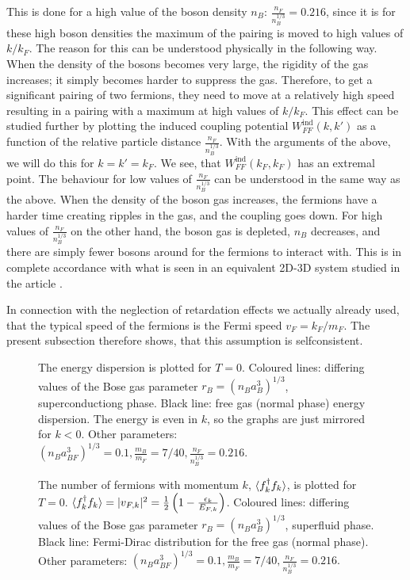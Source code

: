 This is done for a high value of the boson density $n_B$: $\frac{n_F}{n_B^{1/3}} = 0.216$, since it is for these high boson densities the maximum of the pairing is moved to high values of $k/k_F$. The reason for this can be understood physically in the following way. When the density of the bosons becomes very large, the rigidity of the gas increases; it simply becomes harder to suppress the gas. Therefore, to get a significant pairing of two fermions, they need to move at a relatively high speed resulting in a pairing with a maximum at high values of $k/k_F$. This effect can be studied further by plotting the induced coupling potential $W_{FF}^{\text{ind}}(k,k')$ as a function of the relative particle distance $\frac{n_F}{n_B^{1/3}}$. With the arguments of the above, we will do this for $k = k' = k_F$. We see, that $W_{FF}^{\text{ind}}(k_F,k_F)$ has an extremal point. The behaviour for low values of $\frac{n_F}{n_B^{1/3}}$ can be understood in the same way as the above. When the density of the boson gas increases, the fermions have a harder time creating ripples in the gas, and the coupling goes down. For high values of $\frac{n_F}{n_B^{1/3}}$ on the other hand, the boson gas is depleted, $n_B$ decreases, and there are simply fewer bosons around for the fermions to interact with. This is in complete accordance with what is seen in an equivalent 2D-3D system studied in the article \cite{BruunZhigangTopSuperfluid}. 

In connection with the neglection of retardation effects we actually already used, that the typical speed of the fermions is the Fermi speed $v_F = k_F/m_F$. The present subsection therefore shows, that this assumption is selfconsistent. 


\begin{figure} 
\begin{center}  
  
\caption{The energy dispersion is plotted for $T = 0$. Coloured lines: differing values of the Bose gas parameter $r_B = (n_Ba_B^3)^{1/3}$, superconductiong phase. Black line: free gas (normal phase) energy dispersion. The energy is even in $k$, so the graphs are just mirrored for $k < 0$. Other parameters: $(n_Ba_{BF}^3)^{1/3} = 0.1, \frac{m_B}{m_F} = 7/40, \frac{n_F}{n_B^{1/3}} = 0.216.$ }  
\label{fig.EnergyDispersion}  
\end{center}    
\end{figure}


\begin{figure} 
\begin{center}  
  
\caption{The number of fermions with momentum $k$, $\braket{f_k^\dagger f_k}$, is plotted for $T = 0$. $\braket{f_k^\dagger f_k} = |v_{F,k}|^2 = \frac{1}{2}\left(1 - \frac{\epsilon_k}{E_{F,k}}\right)$. Coloured lines: differing values of the Bose gas parameter $r_B = (n_Ba_B^3)^{1/3}$, superfluid phase. Black line: Fermi-Dirac distribution for the free gas (normal phase).  Other parameters: $(n_Ba_{BF}^3)^{1/3} = 0.1, \frac{m_B}{m_F} = 7/40, \frac{n_F}{n_B^{1/3}} = 0.216.$  }  
\label{fig.Occupancy}  
\end{center}    
\end{figure}

